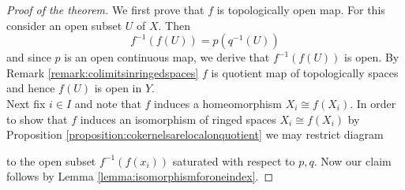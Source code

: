 \begin{proof}[Proof of the theorem]
We first prove that $f$ is topologically open map. For this consider an open subset $U$ of $X$. Then
$$f^{-1}(f(U)) = p(q^{-1}(U))$$
and since $p$ is an open continuous map, we derive that $f^{-1}(f(U))$ is open. By Remark \ref{remark:colimitsinringedspaces} $f$ is quotient map of topologically spaces and hence $f(U)$ is open in $Y$.\\
Next fix $i\in I$ and note that $f$ induces a homeomorphism $X_i\cong f(X_i)$. In order to show that $f$ induces an isomorphism of ringed spaces $X_i \cong f(X_i)$ by Proposition \ref{proposition:cokernelsarelocalonquotient} we may restrict diagram
\begin{center}
\end{center}
to the open subset $f^{-1}\left(f(x_i)\right)$ saturated with respect to $p, q$. Now our claim follows by Lemma \ref{lemma:isomorphismforoneindex}.
\end{proof}


\small



